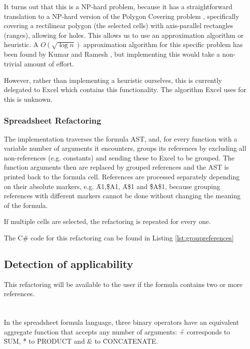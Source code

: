 It turns out that this is a NP-hard problem, because it has a straightforward translation to a NP-hard version of the Polygon Covering problem \cite{masek1979some}, specifically covering a rectilinear polygon (the selected cells) with axis-parallel rectangles (ranges), allowing for holes.
This allows us to use an approximation algorithm or heuristic.
A $O(\sqrt{\log{n}})$ approximation algorithm for this specific problem has been found by Kumar and Ramesh \cite{kumar2003covering}, but implementing this would take a non-trivial amount of effort.

However, rather than implementing a heuristic ourselves, this is currently delegated to Excel which contains this functionality.
The algorithm Excel uses for this is unknown.

\subsubsection{Spreadsheet Refactoring}

The implementation traverses the formula AST, and, for every function with a variable number of arguments it encounters, groups its references by excluding all non-references (e.g. constants) and sending these to Excel to be grouped.
The function arguments then are replaced by grouped references and the AST is printed back to the formula cell.
References are processed separately depending on their absolute markers, e.g. \f{A1},\f{\$A1}, \f{A\$1} and \f{\$A\$1}, because grouping references with different markers cannot be done without changing the meaning of the formula.

\noindent If multiple cells are selected, the refactoring is repeated for every one.

\noindent The C\# code for this refactoring can be found in Listing \ref{lst:groupreferences}

\subsection{Detection of applicability}

This refactoring will be available to the user if the formula contains two or more references.

\section{}
\label{refac:introduceaggregate}

In the spreadsheet formula language, three binary operators have an equivalent aggregate function that accepts any number of arguments: \f{+} corresponds to \f{SUM}, \f{*} to \f{PRODUCT} and \f{\&} to \f{CONCATENATE}.

